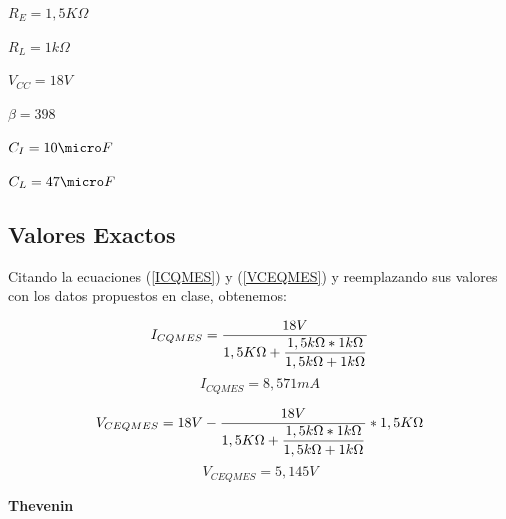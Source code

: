 \documentclass[12pt]{article}
\begin{document}
$R_E=1,5 K\Omega$
 
$R_L=1k\Omega$

$V_{CC}=18V$

$\beta = 398$ 

$C_I=10\micro F$

$C_L=47\micro F$
\subsection{Valores Exactos}
Citando la ecuaciones (\ref{ICQMES}) y (\ref{VCEQMES}) y reemplazando sus valores con los datos propuestos en clase, obtenemos:

\begin{equation}
\label{I_{CQMES}}
I_{CQMES}=\dfrac{18V}{1,5K\Omega+\dfrac{1,5k\Omega*1k\Omega}{1,5k\Omega+1k\Omega}}
\end{equation}
\vspace{0.2cm}
\begin{equation}
I_{CQMES}=8,571mA
\end{equation}

\begin{equation}
\label{V_{CEQMES}}
V_{CEQMES}=18V-\dfrac{18V}{1,5K\Omega+\dfrac{1,5k\Omega*1k\Omega}{1,5k\Omega+1k\Omega}}*1,5K\Omega
\end{equation}
\vspace{0.2cm}
\begin{equation}
V_{CEQMES}=5,145V 
\end{equation}

\newpage
\textbf{Thevenin}
\end{document}
